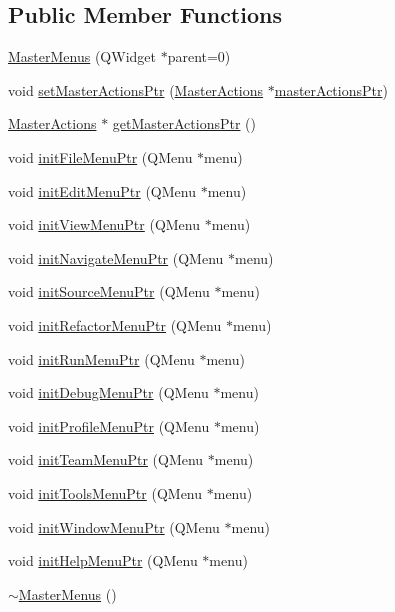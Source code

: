 \subsection*{Public Member Functions}
\begin{DoxyCompactItemize}
\item 
\hyperlink{class_master_menus_aee36f42f90844440ca2d43dc9b89ba9e}{Master\-Menus} (Q\-Widget $\ast$parent=0)
\item 
void \hyperlink{class_master_menus_a8953d8e2f0cab66bade92acc88fc04a6}{set\-Master\-Actions\-Ptr} (\hyperlink{class_master_actions}{Master\-Actions} $\ast$\hyperlink{class_master_menus_ab5ba9c46b8ad0e6eb11345e055ac469d}{master\-Actions\-Ptr})
\item 
\hyperlink{class_master_actions}{Master\-Actions} $\ast$ \hyperlink{class_master_menus_a391ce8b65f45a7e86461260d3d087d7c}{get\-Master\-Actions\-Ptr} ()
\item 
void \hyperlink{class_master_menus_aa8bc0efcd6904b557923f10135b4a6f0}{init\-File\-Menu\-Ptr} (Q\-Menu $\ast$menu)
\item 
void \hyperlink{class_master_menus_a3e332b9f2c0b1f6f8be1804edc3c3a4a}{init\-Edit\-Menu\-Ptr} (Q\-Menu $\ast$menu)
\item 
void \hyperlink{class_master_menus_a072f53ddc7e95bd21257fa094ee6c143}{init\-View\-Menu\-Ptr} (Q\-Menu $\ast$menu)
\item 
void \hyperlink{class_master_menus_a25403797f3c7541b131e622bf4e204bf}{init\-Navigate\-Menu\-Ptr} (Q\-Menu $\ast$menu)
\item 
void \hyperlink{class_master_menus_a9c2d338a75873eaac4914c7d148c109e}{init\-Source\-Menu\-Ptr} (Q\-Menu $\ast$menu)
\item 
void \hyperlink{class_master_menus_afc4b17087ccac9f443f26b7c881ce2bd}{init\-Refactor\-Menu\-Ptr} (Q\-Menu $\ast$menu)
\item 
void \hyperlink{class_master_menus_a8c9b587f8cfea5f8a49e4200adff5690}{init\-Run\-Menu\-Ptr} (Q\-Menu $\ast$menu)
\item 
void \hyperlink{class_master_menus_a395c8d54738fdb875d87b8f1b4f35285}{init\-Debug\-Menu\-Ptr} (Q\-Menu $\ast$menu)
\item 
void \hyperlink{class_master_menus_a126723492781a9da43f1c50cbfcb3876}{init\-Profile\-Menu\-Ptr} (Q\-Menu $\ast$menu)
\item 
void \hyperlink{class_master_menus_ab30cf69cf56d96abea4a201f6f89afb3}{init\-Team\-Menu\-Ptr} (Q\-Menu $\ast$menu)
\item 
void \hyperlink{class_master_menus_a70590f225ba732935b1b270e01e02270}{init\-Tools\-Menu\-Ptr} (Q\-Menu $\ast$menu)
\item 
void \hyperlink{class_master_menus_a65282d762db712fa3eb44cda48a2a52b}{init\-Window\-Menu\-Ptr} (Q\-Menu $\ast$menu)
\item 
void \hyperlink{class_master_menus_a9351214c416efafee85d1d7930c534f8}{init\-Help\-Menu\-Ptr} (Q\-Menu $\ast$menu)
\item 
\hyperlink{class_master_menus_adce7fedd7b1732fc70ec7fcf3725cf22}{$\sim$\-Master\-Menus} ()
\end{DoxyCompactItemize}
